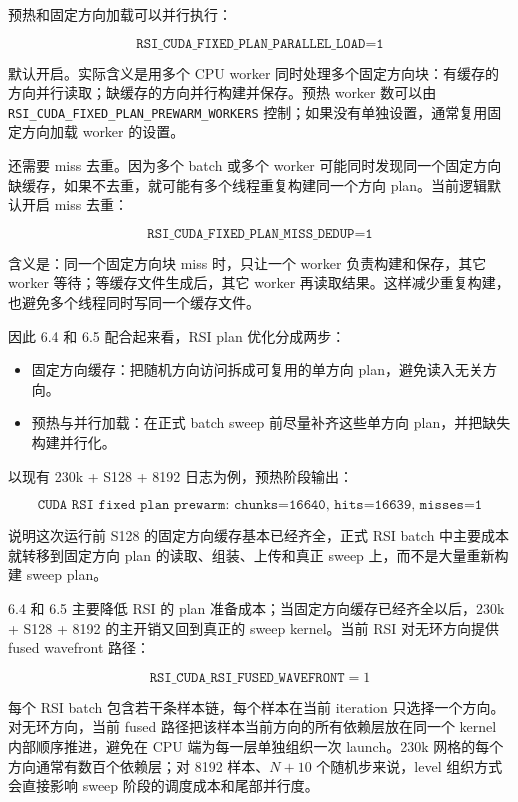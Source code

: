 \documentclass[10pt]{article}
\newcommand{\subsect}[1]{\vspace{2mm}{\sffamily\large\bfseries #1}\par}
\newcommand{\code}[1]{\texttt{#1}}
\begin{document}
预热和固定方向加载可以并行执行：

\[
\code{RSI\_CUDA\_FIXED\_PLAN\_PARALLEL\_LOAD=1}
\]

默认开启。实际含义是用多个 CPU worker 同时处理多个固定方向块：有缓存的方向并行读取；缺缓存的方向并行构建并保存。预热 worker 数可以由 \code{RSI\_CUDA\_FIXED\_PLAN\_PREWARM\_WORKERS} 控制；如果没有单独设置，通常复用固定方向加载 worker 的设置。

还需要 miss 去重。因为多个 batch 或多个 worker 可能同时发现同一个固定方向缺缓存，如果不去重，就可能有多个线程重复构建同一个方向 plan。当前逻辑默认开启 miss 去重：

\[
\code{RSI\_CUDA\_FIXED\_PLAN\_MISS\_DEDUP=1}
\]

含义是：同一个固定方向块 miss 时，只让一个 worker 负责构建和保存，其它 worker 等待；等缓存文件生成后，其它 worker 再读取结果。这样减少重复构建，也避免多个线程同时写同一个缓存文件。

因此 6.4 和 6.5 配合起来看，RSI plan 优化分成两步：

\begin{itemize}
\item 固定方向缓存：把随机方向访问拆成可复用的单方向 plan，避免读入无关方向。
\item 预热与并行加载：在正式 batch sweep 前尽量补齐这些单方向 plan，并把缺失构建并行化。
\end{itemize}

以现有 230k + S128 + 8192 日志为例，预热阶段输出：

\[
\code{CUDA RSI fixed plan prewarm: chunks=16640, hits=16639, misses=1}
\]

说明这次运行前 S128 的固定方向缓存基本已经齐全，正式 RSI batch 中主要成本就转移到固定方向 plan 的读取、组装、上传和真正 sweep 上，而不是大量重新构建 sweep plan。

\subsect{6.6 RSI fused wavefront sweep}

6.4 和 6.5 主要降低 RSI 的 plan 准备成本；当固定方向缓存已经齐全以后，230k + S128 + 8192 的主开销又回到真正的 sweep kernel。当前 RSI 对无环方向提供 fused wavefront 路径：

\[
\code{RSI\_CUDA\_RSI\_FUSED\_WAVEFRONT}=1
\]

每个 RSI batch 包含若干条样本链，每个样本在当前 iteration 只选择一个方向。对无环方向，当前 fused 路径把该样本当前方向的所有依赖层放在同一个 kernel 内部顺序推进，避免在 CPU 端为每一层单独组织一次 launch。230k 网格的每个方向通常有数百个依赖层；对 8192 样本、$N+10$ 个随机步来说，level 组织方式会直接影响 sweep 阶段的调度成本和尾部并行度。
\end{document}
